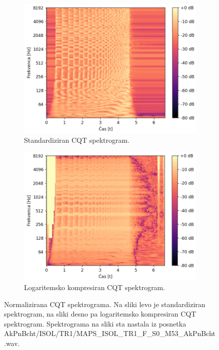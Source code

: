 \documentclass[a4paper, 12pt, openright]{book}
\begin{document}
\begin{figure}
    \centering
    \begin{subfigure}[t]{.45\textwidth}
        \centering
        \includegraphics[width=\linewidth]{cqt_z.png}
        \caption{Standardiziran CQT spektrogram.}
        \label{fig:z}
    \end{subfigure}%
    \hspace{1em}%
    \begin{subfigure}[t]{.45\textwidth}
        \centering
        \includegraphics[width=\linewidth]{cqt_log.png}
        \caption{Logaritemsko kompresiran CQT spektrogram.}
        \label{fig:log}
    \end{subfigure}
    \caption{Normalizirana CQT spektrograma. Na sliki levo je standardiziran spektrogram, na sliki desno pa logaritemsko kompresiran CQT spektrogram. Spektrograma na sliki sta nastala iz posnetka AkPnBcht/ISOL/TR1/MAPS\_ISOL\_TR1\_F\_S0\_M53\_AkPnBcht.wav.}
    \label{fig:normalization}
\end{figure}
\end{document}
